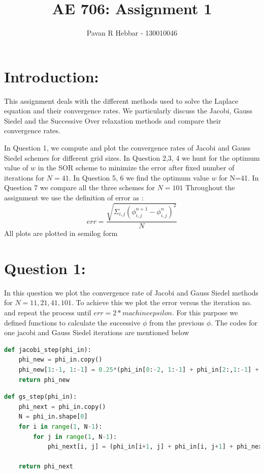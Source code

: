 \documentclass[11pt, a4paper]{article}
\title{\textbf{AE 706: Assignment 1}}
\author{Pavan R Hebbar - 130010046}
\begin{document}
\maketitle
\newpage
\tableofcontents
\newpage
\section{Introduction:}
This assignment deals with the different methods used to solve the Laplace equation and their convergence rates. We particularly
discuss the Jacobi, Gauss Siedel and the Successive Over relaxation methods and compare their convergence rates.

In Question 1, we compute and plot the convergence rates of Jacobi and Gauss Siedel schemes for different grid
sizes. In Question 2,3, 4 we hunt for the optimum value of $w$ in the SOR scheme to minimize the error after fixed 
number of iterations for $N=41$.
In Question 5, 6 we find the optimum value $w$ for N=41. In Question 7 we compare all the three schemes for $N = 101$
Throughout the assignment we use the definition of error as :
\begin{equation}
 err = \frac{\sqrt{\Sigma_{i,j}(\phi_{i,j}^{n+1} - \phi_{i,j}^{n})^2}}{N}
\end{equation}
All plots are plotted in semilog form

\section{Question 1:}
\label{Question1}

In this question we plot the convergence rate of Jacobi and Gauss Siedel methods for $N = 11, 21, 41, 101$. To achieve this we
plot the error versus the iteration no. and repeat the process until $err = 2*machineepsilon$.
For this purpose we defined functions to calculate the successive $\phi$ from the previous $\phi$. The codes for one jacobi and
Gauss Siedel iterations are mentioned below
\begin{lstlisting}[language = Python, caption = Function to perform 1 iteration of Jacobi]
def jacobi_step(phi_in):
    phi_new = phi_in.copy()
    phi_new[1:-1, 1:-1] = 0.25*(phi_in[0:-2, 1:-1] + phi_in[2:,1:-1] + phi_in[1:-1,0:-2] + phi_in[1:-1,2:])
    return phi_new

\end{lstlisting}
\begin{lstlisting}[language = Python, caption = Function to perform 1 iteration of Gauss Siedel]
 def gs_step(phi_in):
    phi_next = phi_in.copy()
    N = phi_in.shape[0]
    for i in range(1, N-1):
        for j in range(1, N-1):
            phi_next[i, j] = (phi_in[i+1, j] + phi_in[i, j+1] + phi_next[i-1, j] + phi_next[i, j-1])*0.25

    return phi_next
\end{lstlisting}
\end{document}
